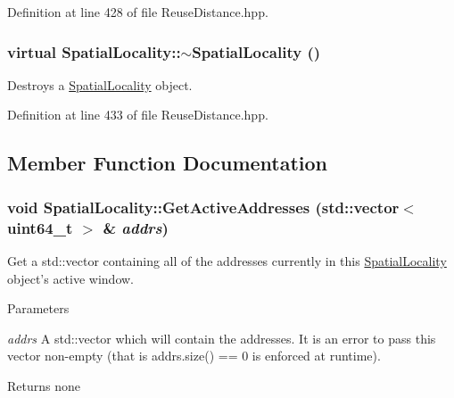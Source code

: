 Definition at line 428 of file ReuseDistance.hpp.

\hypertarget{class_spatial_locality_abfdaf3722786c5ad9ea65f885cbbebc6}{
\subsubsection[{$\sim$SpatialLocality}]{\setlength{\rightskip}{0pt plus 5cm}virtual SpatialLocality::$\sim$SpatialLocality ()}}
\label{class_spatial_locality_abfdaf3722786c5ad9ea65f885cbbebc6}
Destroys a \hyperlink{class_spatial_locality}{SpatialLocality} object. 

Definition at line 433 of file ReuseDistance.hpp.



\subsection{Member Function Documentation}
\hypertarget{class_spatial_locality_afef7ecfce7f238dbef37499e08edfb98}{
\subsubsection[{GetActiveAddresses}]{\setlength{\rightskip}{0pt plus 5cm}void SpatialLocality::GetActiveAddresses (std::vector$<$ uint64\_\-t $>$ \& {\em addrs})}}
\label{class_spatial_locality_afef7ecfce7f238dbef37499e08edfb98}
Get a std::vector containing all of the addresses currently in this \hyperlink{class_spatial_locality}{SpatialLocality} object's active window.


\begin{DoxyParams}{Parameters}
\item[{\em addrs}]A std::vector which will contain the addresses. It is an error to pass this vector non-\/empty (that is addrs.size() == 0 is enforced at runtime).\end{DoxyParams}
\begin{DoxyReturn}{Returns}
none 
\end{DoxyReturn}


